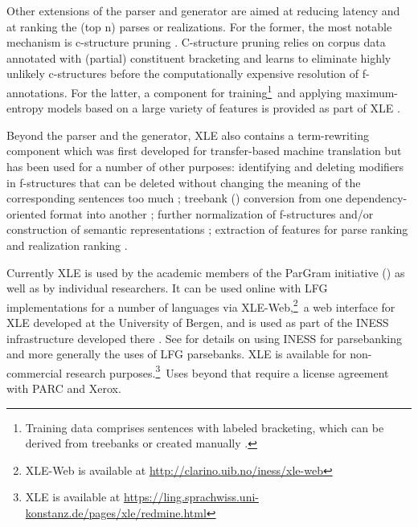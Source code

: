\documentclass[output=paper,hidelinks]{langscibook}
\begin{document}
Other extensions of the parser and generator are aimed at reducing latency and at ranking the (top n) parses or realizations. For the former, the most notable mechanism is c-structure pruning \citep{cahill-etal-2008-speeding}. C-structure pruning relies on corpus data annotated with (partial) constituent bracketing and learns to eliminate highly unlikely c-structures before the computationally expensive resolution of f-annotations. For the latter, a component for training\footnote{Training data comprises sentences with labeled bracketing, which can be derived from treebanks or created manually \citep{Riezler2002King}.}\ and applying maximum-entropy models based on a large variety of features is provided as part of XLE \citep{Riezler2002King}.

Beyond the parser and the generator, XLE also contains a term-rewriting component which was first developed for transfer-based machine translation but has  been used for a number of other purposes: identifying and deleting modifiers in f-structures that can be deleted without changing the meaning of the corresponding sentences too much \citep{riezleretal03}; treebank () conversion from one dependency-oriented format into another \citep{forst-2003-treebank}; further normalization of f-structures and/or construction of semantic representations \citep{crouchking06,bobrowetal07}; extraction of features for parse ranking \citep{forst07} and realization ranking \citep{CahillForst}.

Currently XLE is used by the academic members of the ParGram initiative () as well as by individual researchers. It can be used online with LFG implementations for a number of languages via XLE-Web,\footnote{XLE-Web is available at \url{http://clarino.uib.no/iness/xle-web}}\ a web interface for XLE developed at the University of Bergen, and is used as part of the INESS infrastructure developed there \citep{Rosen09, rosen-desmedt-meurer-dyvik12}. See  for details on using INESS for parsebanking and more generally the uses of LFG parsebanks.
XLE is available for non-commercial research purposes.\footnote{XLE is available at \url{https://ling.sprachwiss.uni-konstanz.de/pages/xle/redmine.html}}\ Uses beyond that require a license agreement with PARC and Xerox.
\end{document}
